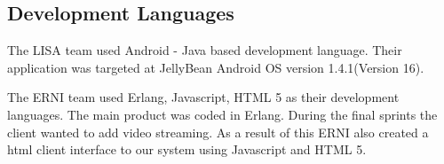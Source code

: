 \subsection{Development Languages}

The LISA team used Android - Java based development language. Their application was targeted at JellyBean Android OS version 1.4.1(Version 16).

The ERNI team used Erlang, Javascript, HTML 5  as their development languages. The main product was coded in Erlang. During the final sprints the client wanted to add video streaming. As a result of this ERNI also created a html client interface to our system using Javascript and HTML 5. 